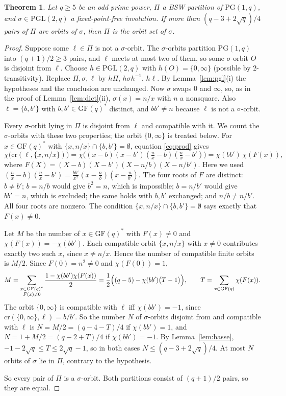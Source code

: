 \documentclass[11pt,a4paper]{article}
\newtheorem{theorem}{Theorem}
\theoremstyle{definition}
\theoremstyle{remark}
\newcommand{\GF}{\mathrm{GF}}
\newcommand{\PG}{\mathrm{PG}}
\newcommand{\PGL}{\mathrm{PGL}}
\newcommand{\cro}{\mathrm{cr}}
\begin{document}
\begin{theorem}\label{thm:stab2}
Let $q\ge5$ be an odd prime power, $\Pi$ a BSW partition of $\PG(1,q)$, and $\sigma\in\PGL(2,q)$ a
fixed-point-free involution. If more than $(q-3+2\sqrt q)/4$ pairs of $\Pi$ are orbits of $\sigma$, then $\Pi$ is
the orbit set of $\sigma$.
\end{theorem}

\begin{proof}
Suppose some $\ell\in\Pi$ is not a $\sigma$-orbit. The $\sigma$-orbits partition $\PG(1,q)$ into
$(q+1)/2\ge3$ pairs, and $\ell$ meets at most two of them, so some $\sigma$-orbit $O$ is disjoint from $\ell$.
Choose $h\in\PGL(2,q)$ with $h(O)=\{0,\infty\}$ (possible by $2$-transitivity). Replace $\Pi,\sigma,\ell$ by
$h\Pi$, $h\sigma h^{-1}$, $h\ell$. By Lemma~\ref{lem:pgl}(i) the hypotheses and the conclusion are unchanged.
Now $\sigma$ swaps $0$ and $\infty$, so, as in the proof of Lemma~\ref{lem:dict}(ii), $\sigma(x)=n/x$ with $n$ a
nonsquare. Also $\ell=\{b,b'\}$ with $b,b'\in\GF(q)^*$ distinct, and $bb'\ne n$ because $\ell$ is not a
$\sigma$-orbit.

Every $\sigma$-orbit lying in $\Pi$ is disjoint from $\ell$ and compatible with it. We count the
$\sigma$-orbits with these two properties; the orbit $\{0,\infty\}$ is treated below. For $x\in\GF(q)^*$ with
$\{x,n/x\}\cap\{b,b'\}=\emptyset$, equation \eqref{eq:prod} gives
\[
\chi\bigl(\cro(\ell,\{x,n/x\})\bigr)=\chi\bigl((x-b)(x-b')(\tfrac nx-b)(\tfrac nx-b')\bigr)
=\chi(bb')\,\chi(F(x)),
\]
where $F(X)=(X-b)(X-b')(X-n/b)(X-n/b')$. Here we used $(\tfrac nx-b)(\tfrac nx-b')=\tfrac{bb'}{x^2}
(x-\tfrac nb)(x-\tfrac n{b'})$. The four roots of $F$ are distinct: $b\ne b'$; $b=n/b$ would give $b^2=n$, which
is impossible; $b=n/b'$ would give $bb'=n$, which is excluded; the same holds with $b,b'$ exchanged; and
$n/b\ne n/b'$. All four roots are nonzero. The condition
$\{x,n/x\}\cap\{b,b'\}=\emptyset$ says exactly that $F(x)\neq0$.

Let $M$ be the number of $x\in\GF(q)^*$ with $F(x)\ne0$ and $\chi(F(x))=-\chi(bb')$. Each compatible orbit
$\{x,n/x\}$ with $x\neq0$ contributes exactly two such $x$, since $x\ne n/x$. Hence the number of compatible
finite orbits is $M/2$. Since $F(0)=n^2\ne0$ and $\chi(F(0))=1$,
\[
M=\sum_{\substack{x\in\GF(q)^*\\F(x)\neq0}}\frac{1-\chi(bb')\chi(F(x))}{2}
=\frac12\Bigl((q-5)-\chi(bb')\bigl(T-1\bigr)\Bigr),\qquad T=\sum_{x\in\GF(q)}\chi(F(x)).
\]
The orbit $\{0,\infty\}$ is compatible with $\ell$ iff $\chi(bb')=-1$, since $\cro(\{0,\infty\},\ell)=b/b'$. So the number
$N$ of $\sigma$-orbits disjoint from and compatible with $\ell$ is $N=M/2=(q-4-T)/4$ if $\chi(bb')=1$, and
$N=1+M/2=(q-2+T)/4$ if $\chi(bb')=-1$. By Lemma~\ref{lem:hasse}, $-1-2\sqrt q\le T\le2\sqrt q-1$, so in both
cases $N\le(q-3+2\sqrt q)/4$. At most $N$ orbits of $\sigma$ lie in $\Pi$, contrary to the hypothesis.

So every pair of $\Pi$ is a $\sigma$-orbit. Both partitions consist of $(q+1)/2$ pairs, so they are equal.
\end{proof}
\end{document}
